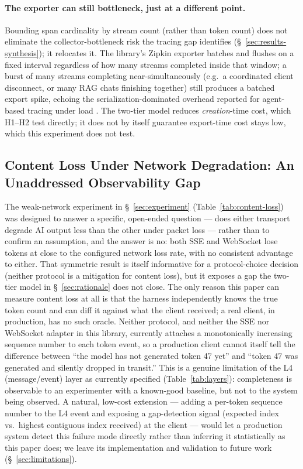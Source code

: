 \documentclass[11pt]{article}
\begin{document}
\paragraph{The exporter can still bottleneck, just at a different point.} Bounding span cardinality by stream count (rather than token count) does not eliminate the collector-bottleneck risk the tracing gap identifies (\S~\ref{sec:results-synthesis}); it relocates it. The library's Zipkin exporter batches and flushes on a fixed interval regardless of how many streams completed inside that window; a burst of many streams completing near-simultaneously (e.g.\ a coordinated client disconnect, or many RAG chats finishing together) still produces a batched export spike, echoing the serialization-dominated overhead reported for agent-based tracing under load \cite{oneuptimews2026}. The two-tier model reduces \emph{creation}-time cost, which H1--H2 test directly; it does not by itself guarantee export-time cost stays low, which this experiment does not test.

\subsection{Content Loss Under Network Degradation: An Unaddressed Observability Gap}
\label{sec:content-loss-gap}
The weak-network experiment in \S~\ref{sec:experiment} (Table~\ref{tab:content-loss}) was designed to answer a specific, open-ended question --- does either transport degrade AI output less than the other under packet loss --- rather than to confirm an assumption, and the answer is no: both SSE and WebSocket lose tokens at close to the configured network loss rate, with no consistent advantage to either. That symmetric result is itself informative for a protocol-choice decision (neither protocol is a mitigation for content loss), but it exposes a gap the two-tier model in \S~\ref{sec:rationale} does not close. The only reason this paper can measure content loss at all is that the harness independently knows the true token count and can diff it against what the client received; a real client, in production, has no such oracle. Neither protocol, and neither the SSE nor WebSocket adapter in this library, currently attaches a monotonically increasing sequence number to each token event, so a production client cannot itself tell the difference between ``the model has not generated token 47 yet'' and ``token 47 was generated and silently dropped in transit.'' This is a genuine limitation of the L4 (message/event) layer as currently specified (Table~\ref{tab:layers}): completeness is observable to an experimenter with a known-good baseline, but not to the system being observed. A natural, low-cost extension --- adding a per-token sequence number to the L4 event and exposing a gap-detection signal (expected index vs.\ highest contiguous index received) at the client --- would let a production system detect this failure mode directly rather than inferring it statistically as this paper does; we leave its implementation and validation to future work (\S~\ref{sec:limitations}).
\end{document}
